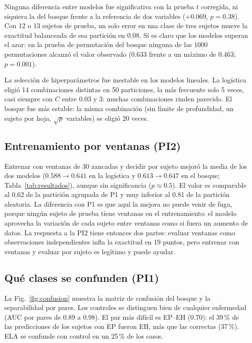 \documentclass[conference]{IEEEtran}
\begin{document}
Ninguna diferencia entre modelos fue significativa con la prueba $t$ corregida, ni siquiera la del bosque frente a la referencia de dos variables ($+0.069$, $p=0.38$). Con 12 o 13 sujetos de prueba, un solo error en una clase de tres sujetos mueve la exactitud balanceada de esa partición en 0.08. Sí es claro que los modelos superan el azar: en la prueba de permutación del bosque ninguna de las 1000 permutaciones alcanzó el valor observado (0.633 frente a un máximo de 0.463; $p=0.001$).

La selección de hiperparámetros fue inestable en los modelos lineales. La logística eligió 14 combinaciones distintas en 50 particiones, la más frecuente solo 5 veces, casi siempre con $C$ entre 0.03 y 3: muchas combinaciones rinden parecido. El bosque fue más estable: la misma combinación (sin límite de profundidad, un sujeto por hoja, $\sqrt{p}$ variables) se eligió 20 veces.

\subsection{Entrenamiento por ventanas (PI2)}
Entrenar con ventanas de 30 zancadas y decidir por sujeto mejoró la media de los dos modelos ($0.588 \rightarrow 0.641$ en la logística y $0.613 \rightarrow 0.647$ en el bosque; Tabla~\ref{tab:resultados}), aunque sin significancia ($p \approx 0.5$). El valor es comparable al 0.62 de la partición agrupada de P1 y muy inferior al 0.81 de la partición aleatoria. La diferencia con P1 es que aquí la mejora no puede venir de fuga, porque ningún sujeto de prueba tiene ventanas en el entrenamiento: el modelo aprovecha la variación de cada sujeto entre ventanas como si fuera un aumento de datos. La respuesta a la PI2 tiene entonces dos partes: evaluar ventanas como observaciones independientes infla la exactitud en 19 puntos, pero entrenar con ventanas y evaluar por sujeto es legítimo y puede ayudar.

\subsection{Qué clases se confunden (PI1)}
La Fig.~\ref{fig:confusion} muestra la matriz de confusión del bosque y la separabilidad por pares. Los controles se distinguen bien de cualquier enfermedad (AUC por pares de 0.89 a 0.98). El par más difícil es EP--EH (0.70): el 39\,\% de las predicciones de los sujetos con EP fueron EH, más que las correctas (37\,\%). ELA se confunde con control en un 25\,\% de los casos.
\end{document}
